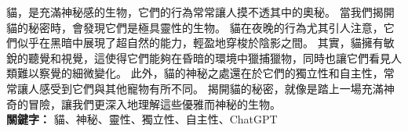 貓，是充滿神秘感的生物，它們的行為常常讓人摸不透其中的奧秘。 當我們揭開貓的秘密時，會發現它們是極具靈性的生物。 貓在夜晚的行為尤其引人注意，它們似乎在黑暗中展現了超自然的能力，輕盈地穿梭於陰影之間。 其實，貓擁有敏銳的聽覺和視覺，這使得它們能夠在昏暗的環境中獵捕獵物，同時也讓它們看見人類難以察覺的細微變化。 此外，貓的神秘之處還在於它們的獨立性和自主性，常常讓人感受到它們與其他寵物有所不同。 揭開貓的秘密，就像是踏上一場充滿神奇的冒險，讓我們更深入地理解這些優雅而神秘的生物。
~ \\

\noindent\textbf{關鍵字：} 貓、神秘、靈性、獨立性、自主性、ChatGPT